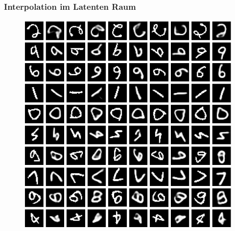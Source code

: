 \begin{frame}
	\frametitle{Interpolation im Latenten Raum}
	\begin{figure}[h!]
		\begin{center}
			\includegraphics[scale=0.3]{Bilder/interpolation}
		\end{center}
	\end{figure}
\end{frame}


